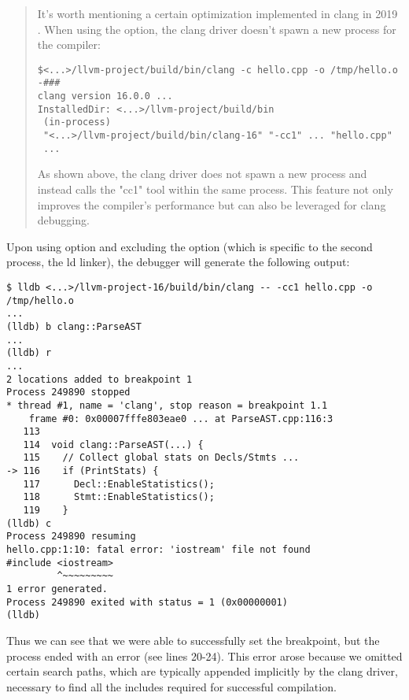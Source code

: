 \begin{quote}
  It's worth mentioning a certain optimization implemented in clang in 2019
  \citep{llvm:D69825}. When using the  option, the clang driver
  doesn't spawn a new process for the compiler:
\begin{adjustwidth}{0em}{0em}
\begin{verbatim}
$<...>/llvm-project/build/bin/clang -c hello.cpp -o /tmp/hello.o -###
clang version 16.0.0 ...
InstalledDir: <...>/llvm-project/build/bin
 (in-process)
 "<...>/llvm-project/build/bin/clang-16" "-cc1" ... "hello.cpp"
 ...
\end{verbatim}                         
\end{adjustwidth}
As shown above, the clang driver does not spawn a new process and instead calls
the "cc1" tool within the same process. This feature not only improves the
compiler's performance but can also be leveraged for clang debugging. 
\end{quote}

Upon using  option and excluding the  option
(which is specific to the second process, the ld linker), the debugger will
generate the following output: 
\begin{verbatim}
$ lldb <...>/llvm-project-16/build/bin/clang -- -cc1 hello.cpp -o /tmp/hello.o
...
(lldb) b clang::ParseAST
...
(lldb) r
...
2 locations added to breakpoint 1
Process 249890 stopped
* thread #1, name = 'clang', stop reason = breakpoint 1.1
    frame #0: 0x00007fffe803eae0 ... at ParseAST.cpp:116:3
   113  
   114  void clang::ParseAST(...) {
   115    // Collect global stats on Decls/Stmts ...
-> 116    if (PrintStats) {
   117      Decl::EnableStatistics();
   118      Stmt::EnableStatistics();
   119    }
(lldb) c
Process 249890 resuming
hello.cpp:1:10: fatal error: 'iostream' file not found
#include <iostream>
         ^~~~~~~~~~
1 error generated.
Process 249890 exited with status = 1 (0x00000001)
(lldb)
\end{verbatim}
Thus we can see that we were able to successfully set the breakpoint, but the
process ended with an error (see lines 20-24). This error arose because we
omitted certain search paths, which are typically appended implicitly by the
clang driver, necessary to find all the includes required for successful
compilation. 

